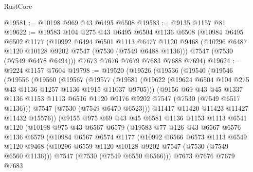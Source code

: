 \begin{lexlean}{RustCore}
\begin{coremodule}
@19581 := @10198 @969 @43 @6495 @6508
@19583 := @9135 @1157 @81
@19622 := @19583
    @104
    @275
    @43
    @6495
    @6504
    @1136
    @6508
    (@10984
      @6495
      @6502
      @1177
      (@10992
        @6494
        @6501
        @1113
        @6477
        @1120
        @9468
        (@10296 @6487 @1120 @10128 @9202 @7547 (@7530 (@7549 @6488 @1136)))
        @7547
        (@7530 (@7549 @6478 @6494)))
      @7673
      @7676
      @7679
      @7683
      @7688
      @7694)
@19624 := @9224 @1157 @7604
@19798 := @19520
    (@19526
      (@19536
        (@19540
          (@19546
            (@19556
              (@19560
                (@19567
                  (@19577
                    (@19581
                      (@19622 (@19624 @6504 @104 @275 @43 @1136 @1257 @1136 @1915 @11037 @9705)))
                    (@9156
                      @69
                      @43
                      @45
                      @1337
                      @1136
                      @1153
                      @1113
                      @6516
                      @1120
                      @9176
                      @9202
                      @7547
                      (@7530 (@7549 @6517 @1136)))
                    @7547
                    (@7530 (@7549 @6470 @6523)))
                  @11417
                  @11420
                  @11423
                  @11427
                  @11432
                  @15576))
              (@9155
                @975
                @69
                @43
                @45
                @6581
                @1136
                @1153
                @1113
                @6541
                @1120
                (@10198
                  @975
                  @43
                  @6567
                  @6579
                  (@19583
                    @77
                    @126
                    @43
                    @6567
                    @6576
                    @1136
                    @6579
                    (@10984
                      @6567
                      @6574
                      @1177
                      (@10992
                        @6566
                        @6573
                        @1113
                        @6549
                        @1120
                        @9468
                        (@10296 @6559 @1120 @10128 @9202 @7547 (@7530 (@7549 @6560 @1136)))
                        @7547
                        (@7530 (@7549 @6550 @6566)))
                      @7673
                      @7676
                      @7679
                      @7683

\end{coremodule}
\end{lexlean}
